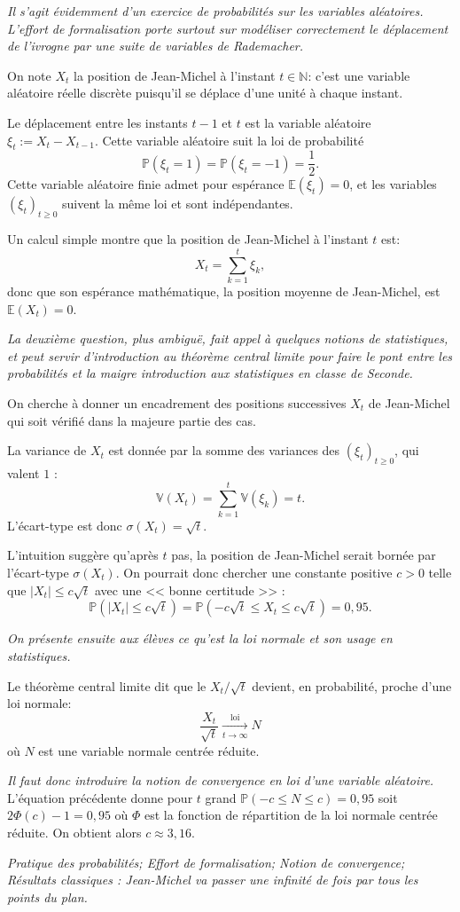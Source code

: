 \documentclass[12pt]{article}
\newcommand{\NN}{\mathbb N}
\newcommand{\PP}{\mathbb P}
\newcommand{\EE}{\mathbb E}
\newcommand{\VV}{\mathbb V}
\theoremstyle{definition}
\begin{document}
\textit{Il s'agit évidemment d'un exercice de probabilités sur les variables aléatoires. L'effort de formalisation porte surtout sur modéliser correctement le déplacement de l'ivrogne par une suite de variables de Rademacher.}

On note $X_t$ la position de Jean-Michel à l'instant $t\in\NN$: c'est une variable aléatoire réelle discrète puisqu'il se déplace d'une unité à chaque instant.

Le déplacement entre les instants $t-1$ et $t$ est la variable aléatoire $\xi_t := X_t-X_{t-1}$. Cette variable aléatoire suit la loi de probabilité
\[
\PP(\xi_t = 1) = \PP(\xi_t = -1) = \frac{1}{2}. 
\]
Cette variable aléatoire finie admet pour espérance $\EE(\xi_t) = 0$, et les variables $(\xi_t)_{t\geq 0}$ suivent la même loi et sont indépendantes.

Un calcul simple montre que la position de Jean-Michel à l'instant $t$ est:
\[
X_t = \sum_{k=1}^t \xi_k,
\]
donc que son espérance mathématique, la position moyenne de Jean-Michel, est $\EE(X_t) = 0$.

\textit{La deuxième question, plus ambiguë, fait appel à quelques notions de statistiques, et peut servir d'introduction au théorème central limite pour faire le pont entre les probabilités et la maigre introduction aux statistiques en classe de Seconde.}

On cherche à donner un encadrement des positions successives $X_t$ de Jean-Michel qui soit vérifié dans la majeure partie des cas.

La variance de $X_t$ est donnée par la somme des variances des $(\xi_t)_{t\geq 0}$, qui valent $1$ :
\[
\VV(X_t) = \sum_{k=1}^t \VV(\xi_k) = t.
\]
L'écart-type est donc $\sigma(X_t) = \sqrt{t}$.

L'intuition suggère qu'après $t$ pas, la position de Jean-Michel serait bornée par l'écart-type $\sigma(X_t)$. On pourrait donc chercher une constante positive $c > 0$ telle que $|X_t| \leq c\sqrt{t}$ avec une << bonne certitude >> :
\[
\PP\left(|X_t|\leq c\sqrt t\right) =
\PP\left(-c\sqrt t \leq X_t \leq c\sqrt t\right) = 0,\!95.
\]

\textit{On présente ensuite aux élèves ce qu'est la loi normale et son usage en statistiques.}


Le théorème central limite dit que le $X_t/\sqrt{t}$ devient, en probabilité, proche d'une loi normale:
\[
\frac{X_t}{\sqrt{t}} \xrightarrow[t\to\infty]{\text{loi}} N
\]
où $N$ est une variable normale centrée réduite.

\textit{Il faut donc introduire la notion de convergence en loi d'une variable aléatoire.}
L'équation précédente donne pour $t$ grand $\PP(-c \leq N \leq c) = 0,\!95$ soit $2\Phi(c) - 1 = 0,\!95$ où $\Phi$ est la fonction de répartition de la loi normale centrée réduite. On obtient alors $c\approx 3,\!16$.

\textit{Pratique des probabilités; Effort de formalisation; Notion de convergence; Résultats classiques : Jean-Michel va passer une infinité de fois par tous les points du plan.}
\end{document}
